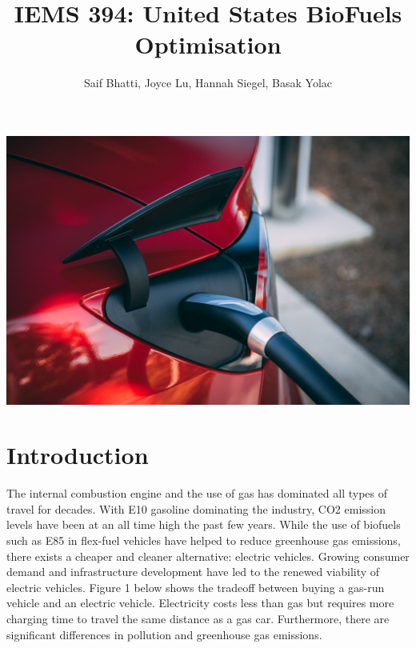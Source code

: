 \documentclass[answers]{exam}
\title{IEMS 394: United States BioFuels Optimisation}
\author{Saif Bhatti, Joyce Lu, Hannah Siegel, Basak Yolac}
\begin{document}
\maketitle
\begin{center}
    \includegraphics[scale=0.07]{cover.jpg}
\end{center}
\newpage
\section{Introduction}
The internal combustion engine and the use of gas has dominated all types of travel for decades. With E10 gasoline dominating the industry, CO2 emission levels have been at an all time high the past few years\cite{stanford}. While the use of biofuels such as E85 in flex-fuel vehicles have helped to reduce greenhouse gas emissions, there exists a cheaper and cleaner alternative: electric vehicles. Growing consumer demand and infrastructure development have led to the renewed viability of electric vehicles. Figure 1 below shows the tradeoff between buying a gas-run vehicle and an electric vehicle. Electricity costs less than gas but requires more charging time to travel the same distance as a gas car. Furthermore, there are significant differences in pollution and greenhouse gas emissions.
\end{document}
